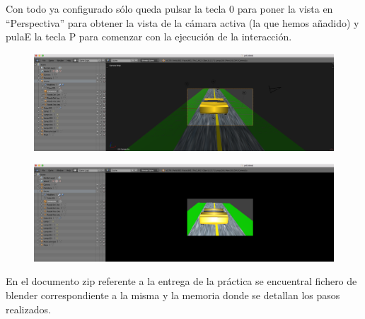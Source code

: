 \documentclass[10pt]{article}
\begin{document}
Con todo ya configurado sólo queda pulsar la tecla 0 para poner la vista en ``Perspectiva'' para obtener la vista de la cámara activa (la que hemos añadido) y pulaE la tecla P para comenzar con la ejecución de la interacción.\\

\begin{figure}[H]
	\begin{center}
	 		\includegraphics[width = 1.00\textwidth]{Imagenes/p4-img16}
	\end{center} 
\end{figure}

\begin{figure}[H]
	\begin{center}
	 		\includegraphics[width = 1.00\textwidth]{Imagenes/p4-img17}
	\end{center} 
\end{figure}

En el documento zip referente a la entrega de la práctica se encuentral fichero de blender correspondiente a la misma y la memoria donde se detallan los pasos realizados.
\end{document}
